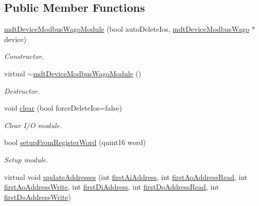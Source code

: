 \subsection*{Public Member Functions}
\begin{DoxyCompactItemize}
\item 
\hyperlink{classmdt_device_modbus_wago_module_a888f4d413d3bde075733ddbba4ae7d96}{mdt\-Device\-Modbus\-Wago\-Module} (bool auto\-Delete\-Ios, \hyperlink{classmdt_device_modbus_wago}{mdt\-Device\-Modbus\-Wago} $\ast$device)
\begin{DoxyCompactList}\small\item\em Constructor. \end{DoxyCompactList}\item 
virtual \hyperlink{classmdt_device_modbus_wago_module_af47e8774515e5960ffb87bc6ec81cea2}{$\sim$mdt\-Device\-Modbus\-Wago\-Module} ()
\begin{DoxyCompactList}\small\item\em Destructor. \end{DoxyCompactList}\item 
void \hyperlink{classmdt_device_modbus_wago_module_a7f874ff01aa984101b1d867c781eba67}{clear} (bool force\-Delete\-Ios=false)
\begin{DoxyCompactList}\small\item\em Clear I/\-O module. \end{DoxyCompactList}\item 
bool \hyperlink{classmdt_device_modbus_wago_module_adf7431cd4d41d7839b42cc21badeabc5}{setup\-From\-Register\-Word} (quint16 word)
\begin{DoxyCompactList}\small\item\em Setup module. \end{DoxyCompactList}\item 
virtual void \hyperlink{classmdt_device_modbus_wago_module_ac7d9da94e7d4c06e288a346ac123c711}{update\-Addresses} (int \hyperlink{classmdt_device_modbus_wago_module_a502dc2388ecf0531786c09964b4f7566}{first\-Ai\-Address}, int \hyperlink{classmdt_device_modbus_wago_module_acd623a8d9956fd79c11c01879afdc73c}{first\-Ao\-Address\-Read}, int \hyperlink{classmdt_device_modbus_wago_module_af8b6d9549c820869b09a77ae01e9bf3f}{first\-Ao\-Address\-Write}, int \hyperlink{classmdt_device_modbus_wago_module_a2229734519a6168e459115a87c7caa5c}{first\-Di\-Address}, int \hyperlink{classmdt_device_modbus_wago_module_ac7279bc692cba522a5e06abfec5012a9}{first\-Do\-Address\-Read}, int \hyperlink{classmdt_device_modbus_wago_module_a31165c5734801029ea530be8774da5de}{first\-Do\-Address\-Write})

\end{DoxyCompactItemize}
